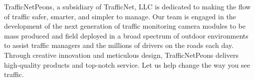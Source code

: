 TrafficNetPeons, a subsidiary of TrafficNet, LLC is dedicated to making the flow of traffic safer, smarter, and simpler to manage. Our team is engaged in the development of the next generation of traffic monitoring camera modules to be mass produced and field deployed in a broad spectrum of outdoor environments to assist traffic managers and the millions of drivers on the roads each day. Through creative innovation and meticulous design, TrafficNetPeons delivers high-quality products and top-notch service. Let us help change the way you see traffic.
